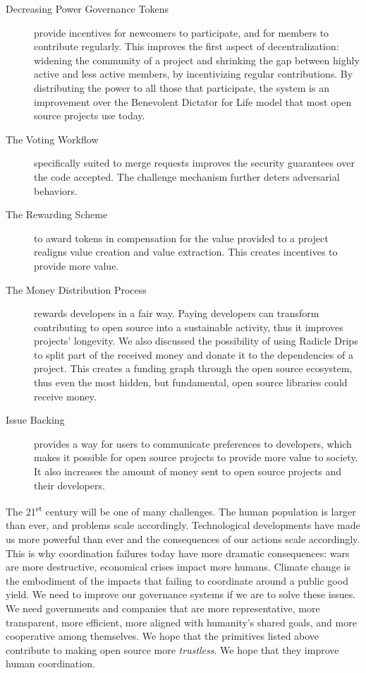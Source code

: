 \begin{description}
  \item[Decreasing Power Governance Tokens]
    provide incentives for newcomers to participate, and for members to contribute regularly.
    This improves the first aspect of decentralization: widening the community of a project and shrinking the gap between highly active and less active members, by incentivizing regular contributions.
    By distributing the power to all those that participate, the system is an improvement over the Benevolent Dicta\-tor for Life model that most open source projects use today.
  \item[The Voting Workflow]
    specifically suited to merge requests improves the security guarantees over the code accepted.
    The challenge mechanism further deters adversarial behaviors.
  \item[The Rewarding Scheme]
    to award tokens in compensation for the value provided to a project realigns value creation and value extraction.
    This creates incentives to provide more value.
  \item[The Money Distribution Process]
    rewards developers in a fair way.
    Paying developers can transform contributing to open source into a sustainable activity, thus it improves projects' longevity.
    We also discussed the possibility of using Radicle Drips to split part of the received money and donate it to the dependencies of a project.
    This creates a funding graph through the open source ecosystem, thus even the most hidden, but fundamental, open source libraries could receive money.
  \item[Issue Backing]
    provides a way for users to communicate preferences to developers, which makes it possible for open source projects to provide more value to society.
    It also increases the amount of money sent to open source projects and their developers.
\end{description}

\leavevmode{}%
The 21\textsuperscript{st} century will be one of many challenges.
The human population is larger than ever, and problems scale accordingly.
Technological developments have made us more powerful than ever and the consequences of our actions scale accordingly.
This is why coordination failures today have more dramatic consequences: wars are more destructive, economical crises impact more humans.
Climate change is the embodiment of the impacts that failing to coordinate around a public good yield.
We need to improve our governance systems if we are to solve these issues.
We need governments and companies that are more representative, more transparent, more efficient, more aligned with humanity's shared goals, and more cooperative among themselves.
We hope that the primitives listed above contribute to making open source more \emph{trustless}.
We hope that they improve human coordination.
